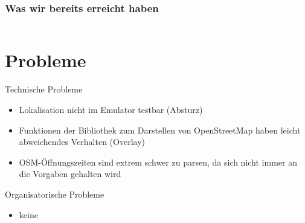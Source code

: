 \documentclass[hyperref]{beamer}
\begin{document}
\begin{frame}
  \frametitle{Was wir bereits erreicht haben}
  \begin{columns}
  \column{5.1cm}
  \column{5cm}
  \end{columns}
\end{frame}


\section{Probleme}

\begin{frame}{Technische Probleme}
	\begin{itemize}
		\item Lokalisation nicht im Emulator testbar (Absturz)
		\item Funktionen der Bibliothek zum Darstellen von OpenStreetMap haben leicht abweichendes Verhalten (Overlay)
		\item OSM-Öffnungszeiten sind extrem schwer zu parsen, da sich nicht immer an die Vorgaben gehalten wird
	\end{itemize}
\end{frame}

\begin{frame}{Organisatorische Probleme}
	\begin{itemize}
		\item keine
	\end{itemize}
\end{frame}
\end{document}
